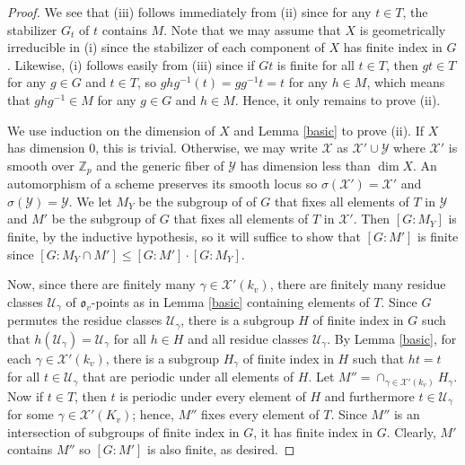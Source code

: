 \documentclass[10pt,a4paper]{amsart}
\newcommand{\bZ} {\mathbb{Z}}
\newcommand{\cU}{\mathcal{U}}
\newcommand{\cX}{\mathcal X}
\newcommand{\cY}{\mathcal Y}
\newcommand{\fo}{\mathfrak o}
\begin{document}
\begin{proof}
  We see that (iii) follows immediately from (ii) since for any
  $t \in T$, the stabilizer $G_t$ of $t$ contains $M$.  Note that we
  may assume that $X$ is geometrically irreducible in (i) since the
  stabilizer of each component of $X$ has finite index in $G$.
  Likewise, (i) follows easily from (iii) since  if $Gt$ is finite
  for all $t \in T$, then $gt \in T$ for any $g
  \in G$ and $t \in T$, so $ghg^{-1}(t) = g g^{-1} t = t$ for
  any $h \in M$, which means that $g h g^{-1} \in M$ for any $g \in G$
  and $h \in M$.   Hence, it only remains to prove (ii).  
  
We use induction on the dimension of $X$ and Lemma \ref{basic} to prove
(ii).  If $X$
has dimension 0, this is trivial.  Otherwise, we may write $\cX$ as
$\cX' \cup \cY$ where $\cX'$ is smooth over $\bZ_p$ and the generic
fiber of $\cY$ has dimension less than $\dim X$.  An automorphism of a
scheme preserves its smooth locus so $\sigma(\cX') = \cX'$ and
$\sigma(\cY) = \cY$.  We let $M_Y$ be the subgroup of of $G$ that
fixes all elements of $T$ in $\cY$ and $M'$ be the subgroup of $G$
that fixes all elements of $T$ in $\cX'$.  Then $[G:M_Y]$ is finite,
by the inductive hypothesis, so it will suffice to show that $[G:M']$
is finite
since $[G:M_Y \cap M'] \leq [G:M'] \cdot [G:M_Y]$.  

Now, since there are finitely many $\gamma \in \cX'(k_v)$, there are
finitely many residue classes $\cU_\gamma$ of $\fo_v$-points as in
Lemma \ref{basic} containing elements of $T$.  Since $G$ permutes the
residue classes $\cU_\gamma$, there is a subgroup $H$ of finite index
in $G$ such that $h(\cU_\gamma) = \cU_\gamma$ for all $h \in H$ and
all residue classes $\cU_\gamma$. By Lemma \ref{basic}, for each
$\gamma \in \cX'(k_v)$, there is a subgroup $H_\gamma$ of finite index
in $H$ such that $ht =t$ for all $t \in \cU_\gamma$ that are periodic
under all elements of $H$.  Let
$M'' = \cap_{\gamma \in \cX'(k_v)} H_\gamma$.  Now if $t \in T$, then
$t$ is periodic under every element of $H$ and furthermore
$t \in \cU_\gamma$ for some $\gamma \in \cX'(K_v)$; hence, $M''$ fixes
every element of $T$.  Since $M''$ is an intersection of subgroups of
finite index in $G$, it has finite index in $G$.  Clearly, $M'$
contains $M''$ so $[G:M']$ is also finite, as desired.
\end{proof}
\end{document}
